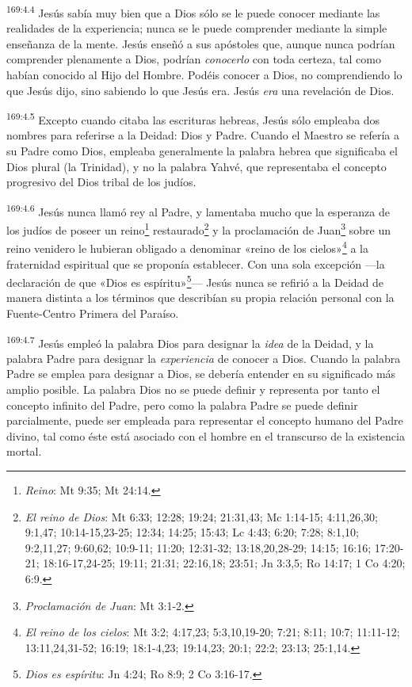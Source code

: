 \par 
\textsuperscript{169:4.4} Jesús sabía muy bien que a Dios sólo se le puede conocer mediante las realidades de la experiencia; nunca se le puede comprender mediante la simple enseñanza de la mente. Jesús enseñó a sus apóstoles que, aunque nunca podrían comprender plenamente a Dios, podrían \textit{conocerlo} con toda certeza, tal como habían conocido al Hijo del Hombre. Podéis conocer a Dios, no comprendiendo lo que Jesús dijo, sino sabiendo lo que Jesús era. Jesús \textit{era} una revelación de Dios.

\par 
\textsuperscript{169:4.5} Excepto cuando citaba las escrituras hebreas, Jesús sólo empleaba dos nombres para referirse a la Deidad: Dios y Padre. Cuando el Maestro se refería a su Padre como Dios, empleaba generalmente la palabra hebrea que significaba el Dios plural (la Trinidad), y no la palabra Yahvé, que representaba el concepto progresivo del Dios tribal de los judíos.

\par 
\textsuperscript{169:4.6} Jesús nunca llamó rey al Padre, y lamentaba mucho que la esperanza de los judíos de poseer un reino\footnote{\textit{Reino}: Mt 9:35; Mt 24:14.} restaurado\footnote{\textit{El reino de Dios}: Mt 6:33; 12:28; 19:24; 21:31,43; Mc 1:14-15; 4:11,26,30; 9:1,47; 10:14-15,23-25; 12:34; 14:25; 15:43; Lc 4:43; 6:20; 7:28; 8:1,10; 9:2,11,27; 9:60,62; 10:9-11; 11:20; 12:31-32; 13:18,20,28-29; 14:15; 16:16; 17:20-21; 18:16-17,24-25; 19:11; 21:31; 22:16,18; 23:51; Jn 3:3,5; Ro 14:17; 1 Co 4:20; 6:9.} y la proclamación de Juan\footnote{\textit{Proclamación de Juan}: Mt 3:1-2.} sobre un reino venidero le hubieran obligado a denominar «reino de los cielos»\footnote{\textit{El reino de los cielos}: Mt 3:2; 4:17,23; 5:3,10,19-20; 7:21; 8:11; 10:7; 11:11-12; 13:11,24,31-52; 16:19; 18:1-4,23; 19:14,23; 20:1; 22:2; 23:13; 25:1,14.} a la fraternidad espiritual que se proponía establecer. Con una sola excepción ---la declaración de que «Dios es espíritu»\footnote{\textit{Dios es espíritu}: Jn 4:24; Ro 8:9; 2 Co 3:16-17.}--- Jesús nunca se refirió a la Deidad de manera distinta a los términos que describían su propia relación personal con la Fuente-Centro Primera del Paraíso.

\par 
\textsuperscript{169:4.7} Jesús empleó la palabra Dios para designar la \textit{idea} de la Deidad, y la palabra Padre para designar la \textit{experiencia} de conocer a Dios. Cuando la palabra Padre se emplea para designar a Dios, se debería entender en su significado más amplio posible. La palabra Dios no se puede definir y representa por tanto el concepto infinito del Padre, pero como la palabra Padre se puede definir parcialmente, puede ser empleada para representar el concepto humano del Padre divino, tal como éste está asociado con el hombre en el transcurso de la existencia mortal.

